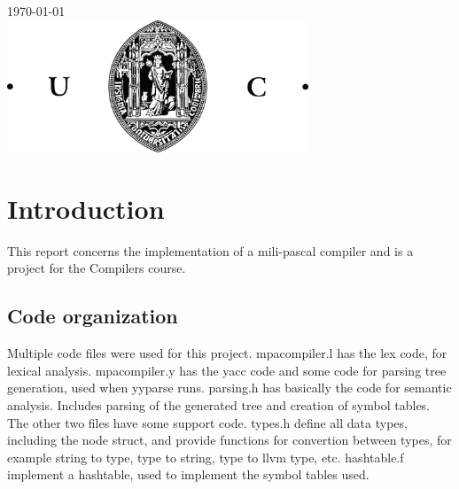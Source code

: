 \documentclass[12pt]{article}
\begin{document}
\begin{titlepage}
{\large \today}\\[2cm] %


\includegraphics [width=9cm]{logo.jpg}\\[1cm] %
 

\vfill %

\end{titlepage}


\section{Introduction}

This report concerns the implementation of a mili-pascal compiler and is a project for the Compilers course.

\subsection{Code organization}

Multiple code files were used for this project. mpacompiler.l has the lex code, for lexical analysis. mpacompiler.y has the yacc code and some code for parsing tree generation, used when yyparse runs. parsing.h has basically the code for semantic analysis. Includes parsing of the generated tree and creation of symbol tables.\\
The other two files have some support code. types.h define all data types, including the node struct, and provide functions for convertion between types, for example string to type, type to string, type to llvm type, etc. hashtable.f implement a hashtable, used to implement the symbol tables used.\\
\end{document}
